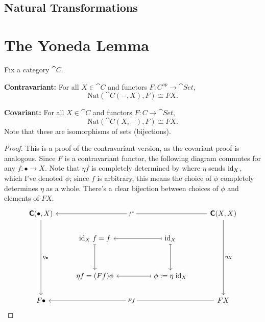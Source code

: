 \documentclass[twoside,10pt]{report}
\begin{document}

\subsection{Natural Transformations}


\section{The Yoneda Lemma}


\begin{thrm}
	Fix a category $\cat{C}$.

	\textbf{Contravariant:} For all $X \in \cat{C}$ and functors $F: C^{op}\to \cat{Set}$,
	\[
	\text{Nat}( \cat{C}(-,X), F) \cong FX.
	\] 

	\textbf{Covariant:} For all $X \in \cat{C}$ and functors $F: C\to \cat{Set}$,
	\[
	\text{Nat}( \cat{C}(X,-), F) \cong FX.
	\] 
	Note that these are isomorphisms of sets (bijections).
\end{thrm}
\begin{proof}
	This is a proof of the contravariant version, as the covariant proof is analogous. Since $F$ is a contravariant functor, the following diagram commutes for any $f: \bullet \to X$. Note that $\eta f$ is completely determined by where $\eta$ sends $\operatorname{id}_{X}$, which I've denoted $\phi$; since $f$ is arbitrary, this means the choice of $\phi$ completely determines $\eta$ as a whole. There's a clear bijection between choices of $\phi$ and elements of $FX$.
	\[\begin{tikzcd}
	{\cat{C}(\bullet,X)} &&&& {\cat{C}(X,X)} \\
	& {\text{id}_X \; f = f} && {\text{id}_X} \\
	\\
	& {\eta f = (Ff)\phi} && {\phi := \eta \; \text{id}_X} \\
	F\bullet &&&& FX
	\arrow["{\eta_\bullet}", from=1-1, to=5-1]
	\arrow["{\eta_X}", from=1-5, to=5-5]
	\arrow["{f^*}"{description}, from=1-5, to=1-1]
	\arrow["Ff"{description}, from=5-5, to=5-1]
	\arrow[maps to, from=2-4, to=2-2]
	\arrow[maps to, from=2-4, to=4-4]
	\arrow[maps to, from=4-4, to=4-2]
	\arrow[maps to, from=2-2, to=4-2]
	\end{tikzcd}\]
\end{proof}
\end{document}
